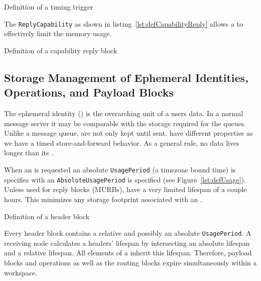 \begin{lstfloat}[ht]
	
	\caption{Definition of a timing trigger}
	\label{lst:defUsage}
\end{lstfloat}

The \texttt{ReplyCapability} as shown in listing~\ref{lst:defCapabilityReply} allows a \VortexNode{} to effectively limit the memory usage. 
\begin{lstfloat}[ht]
	
	\caption{Definition of a capability reply block}
	\label{lst:defCapabilityReply}
\end{lstfloat}


\subsection{Storage Management of Ephemeral Identities,  Operations, and Payload Blocks}
The ephemeral identity () is the overarching unit of a users data. In a normal message server it may be comparable with the storage required for the queues. Unlike a message queue, \VortexMessages{} are not only kept until sent. \VortexMessages{} have different properties as we have a timed store-and-forward behavior. As a general rule, no data lives longer than its .

When an  is requested an absolute \texttt{UsagePeriod} (a timezone bound time) is specifies with an \texttt{AbsoluteUsagePeriod} is specified (see Figure~\ref{lst:defUsage}). Unless used for reply blocks (MURBs),  have a very limited lifespan of a couple hours. This minimizes any storage footprint associated with an . 

\begin{lstfloat}[ht]
	
	\caption{Definition of a header block}
	\label{lst:defHeaderBlock}
\end{lstfloat}

Every header block contains a relative and possibly an absolute \texttt{UsagePeriod}. A receiving node calculates a headers' lifespan by intersecting an absolute lifespan and a relative lifespan. All elements of a \VortexMessage{} inherit this lifespan. Therefore, payload blocks and operations as well as the routing blocks expire simultaneously within a workspace.

